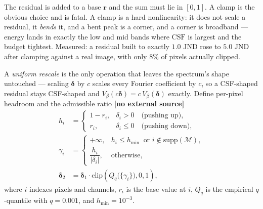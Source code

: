 \documentclass[11pt,a4paper]{article}
\newcommand{\novel}{\textbf{[no external source]}}
\begin{document}
The residual is added to a base $\mathbf{r}$ and the sum must lie in
$[0,1]$. A clamp is the obvious choice and is fatal. A clamp is a hard
nonlinearity: it does not scale a residual, it \emph{bends} it, and a bent
peak is a corner, and a corner is broadband --- energy lands in exactly the
low and mid bands where $\mathrm{CSF}$ is largest and the budget tightest.
Measured: a residual built to exactly $1.0$ JND rose to $5.0$ JND after
clamping against a real image, with only $8\%$ of pixels actually clipped.

A \emph{uniform rescale} is the only operation that leaves the spectrum's
shape untouched --- scaling $\boldsymbol{\delta}$ by $c$ scales every
Fourier coefficient by $c$, so a CSF-shaped residual stays CSF-shaped and
$V_\beta(c\boldsymbol{\delta})=c\,V_\beta(\boldsymbol{\delta})$ exactly.
Define per-pixel headroom and the admissible ratio \novel{}
\begin{align}
  h_i &= \begin{cases}
      1-r_i, & \delta_i>0 \quad\text{(pushing up)},\\
      r_i,   & \delta_i\le0 \quad\text{(pushing down)},
  \end{cases} \label{eq:headroom}\\[3pt]
  \gamma_i &= \begin{cases}
      +\infty, & h_i \le h_{\min}\ \text{ or } i\notin\mathrm{supp}(\mathcal{M}),\\[2pt]
      \dfrac{h_i}{|\delta_i|}, & \text{otherwise},
  \end{cases} \label{eq:ratio}\\[3pt]
  \boldsymbol{\delta}_2
     &= \boldsymbol{\delta}_1 \cdot
        \mathrm{clip}\!\left(Q_q\big(\{\gamma_i\}\big),0,1\right),
  \label{eq:fit}
\end{align}
where $i$ indexes pixels and channels, $r_i$ is the base value at $i$,
$Q_q$ is the empirical $q$-quantile with $q=0.001$, and
$h_{\min}=10^{-3}$.
\end{document}
